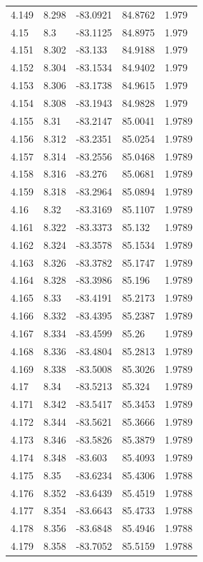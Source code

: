 \begin{tabular}{lllll}
4.149 & 8.298 & -83.0921 & 84.8762 & 1.979 \\
4.15 & 8.3 & -83.1125 & 84.8975 & 1.979 \\
4.151 & 8.302 & -83.133 & 84.9188 & 1.979 \\
4.152 & 8.304 & -83.1534 & 84.9402 & 1.979 \\
4.153 & 8.306 & -83.1738 & 84.9615 & 1.979 \\
4.154 & 8.308 & -83.1943 & 84.9828 & 1.979 \\
4.155 & 8.31 & -83.2147 & 85.0041 & 1.9789 \\
4.156 & 8.312 & -83.2351 & 85.0254 & 1.9789 \\
4.157 & 8.314 & -83.2556 & 85.0468 & 1.9789 \\
4.158 & 8.316 & -83.276 & 85.0681 & 1.9789 \\
4.159 & 8.318 & -83.2964 & 85.0894 & 1.9789 \\
4.16 & 8.32 & -83.3169 & 85.1107 & 1.9789 \\
4.161 & 8.322 & -83.3373 & 85.132 & 1.9789 \\
4.162 & 8.324 & -83.3578 & 85.1534 & 1.9789 \\
4.163 & 8.326 & -83.3782 & 85.1747 & 1.9789 \\
4.164 & 8.328 & -83.3986 & 85.196 & 1.9789 \\
4.165 & 8.33 & -83.4191 & 85.2173 & 1.9789 \\
4.166 & 8.332 & -83.4395 & 85.2387 & 1.9789 \\
4.167 & 8.334 & -83.4599 & 85.26 & 1.9789 \\
4.168 & 8.336 & -83.4804 & 85.2813 & 1.9789 \\
4.169 & 8.338 & -83.5008 & 85.3026 & 1.9789 \\
4.17 & 8.34 & -83.5213 & 85.324 & 1.9789 \\
4.171 & 8.342 & -83.5417 & 85.3453 & 1.9789 \\
4.172 & 8.344 & -83.5621 & 85.3666 & 1.9789 \\
4.173 & 8.346 & -83.5826 & 85.3879 & 1.9789 \\
4.174 & 8.348 & -83.603 & 85.4093 & 1.9789 \\
4.175 & 8.35 & -83.6234 & 85.4306 & 1.9788 \\
4.176 & 8.352 & -83.6439 & 85.4519 & 1.9788 \\
4.177 & 8.354 & -83.6643 & 85.4733 & 1.9788 \\
4.178 & 8.356 & -83.6848 & 85.4946 & 1.9788 \\
4.179 & 8.358 & -83.7052 & 85.5159 & 1.9788 \\

\end{tabular}
